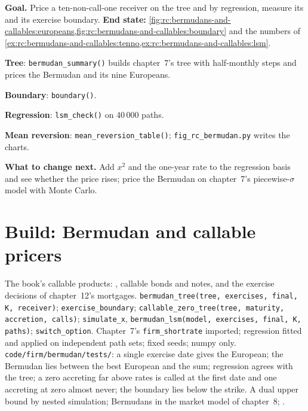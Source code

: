 \begin{tutorial}
\textbf{Goal.} Price a ten-non-call-one receiver on the tree and by regression,
measure its  and its exercise boundary. \textbf{End state:}
\cref{fig:rc:bermudans-and-callables:europeans,fig:rc:bermudans-and-callables:boundary}
and the numbers of \cref{ex:rc:bermudans-and-callables:tenno,ex:rc:bermudans-and-callables:lsm}.
\begin{tutsteps}
\item \textbf{Tree}: \texttt{bermudan\_summary()} builds chapter~7's tree with
half-monthly steps and prices the Bermudan and its nine Europeans.
\item \textbf{Boundary}: \texttt{boundary()}.
\item \textbf{Regression}: \texttt{lsm\_check()} on 40\,000 paths.
\item \textbf{Mean reversion}: \texttt{mean\_reversion\_table()};
\texttt{fig\_rc\_bermudan.py} writes the charts.
\end{tutsteps}
\textbf{What to change next.} Add $x^2$ and the one-year rate to the regression
basis and see whether the price rises; price the Bermudan on chapter~7's
piecewise-$\sigma$ model with Monte Carlo.
\end{tutorial}

\section{Build: Bermudan and callable pricers}\label{bld:rc:bermudans-and-callables:bermudan}

\begin{build}
 The book's callable products: , callable bonds
and notes, and the exercise decisions of chapter~12's mortgages.
 \texttt{bermudan\_tree(tree, exercises, final, K, receiver)};
\texttt{exercise\_boundary}; \texttt{callable\_zero\_tree(tree, maturity,
accretion, calls)}; \texttt{simulate\_x}, \texttt{bermudan\_lsm(model, exercises,
final, K, paths)}; \texttt{switch\_option}.
 Chapter~7's \texttt{firm\_shortrate} imported; regression fitted and
applied on independent path sets; fixed seeds; numpy only.
 \texttt{code/firm/bermudan/tests/}: a single exercise
date gives the European; the Bermudan lies between the best European and the
sum; regression agrees with the tree; a zero accreting far above rates is
called at the first date and one accreting at zero almost never; the
boundary lies below the strike.
 A dual upper bound by nested simulation; Bermudans in the market
model of chapter~8; .
\end{build}

